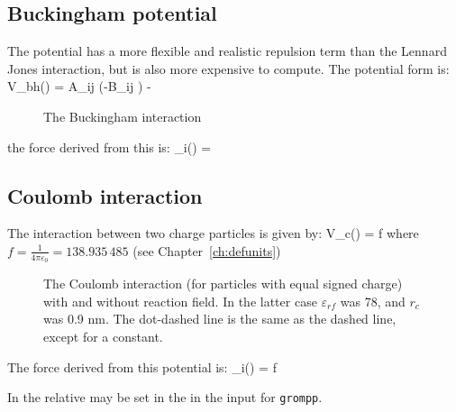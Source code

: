 \subsection{Buckingham potential}
The  
potential has a more flexible and realistic repulsion term
than the Lennard Jones interaction, but is also more expensive to
compute. The potential form is:
\beq
V_{bh}(\rij) = A_{ij} \exp(-B_{ij} \rij) -
\eeq
\begin {figure}[ht]
\centerline{}
\caption {The Buckingham interaction}
\label{fig:bham}
\end {figure}

the force derived from this is:
\beq
 _i(\rij) =  \rnorm
\eeq

\subsection{Coulomb interaction}
\label{sec:coul}
\newcommand{\epsr}{\varepsilon_r}
\newcommand{\epsrf}{\varepsilon_{rf}}
The  interaction between two charge particles is given by:
\beq
V_c(\rij) = f \frac{q_i q_j}{\epsr \rij}
\eeq
where $f = \frac{1}{4\pi \varepsilon_0} = 138.935\,485$ (see Chapter~\ref{ch:defunits})
\begin {figure}[ht]
\centerline{}
\caption{The Coulomb interaction (for particles with equal signed charge) with
and without reaction field. In the latter case $\epsrf$ was 78, and $r_c$ was 0.9 nm. The dot-dashed line is the same as the dashed line, except for
a constant.}
\label{fig:coul}
\end {figure}

The force derived from this potential is:
\beq
{}_i(\rvij) = f \frac{q_i q_j}{\epsr\rij^2}\rnorm
\eeq

In {\gromacs} the  relative  
\normindex{$\epsr$}
may be set in the in the input for {\tt grompp}. 

